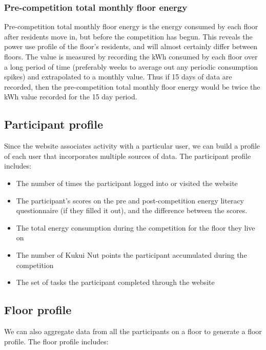 \subsubsection{Pre-competition total monthly floor energy}
Pre-competition total monthly floor energy is the energy consumed by each floor after residents move in, but before the competition has begun. This reveals the power use profile of the floor's residents, and will almost certainly differ between floors. The value is measured by recording the kWh consumed by each floor over a long period of time (preferably weeks to average out any periodic consumption spikes) and extrapolated to a monthly value. Thus if 15 days of data are recorded, then the pre-competition total monthly floor energy would be twice the kWh value recorded for the 15 day period.

\subsection{Participant profile}

Since the website associates activity with a particular user, we can build a profile of each user that incorporates multiple sources of data. The participant profile includes:

\begin{itemize}
\item The number of times the participant logged into or visited the website
\item The participant's scores on the pre and post-competition energy literacy questionnaire (if they filled it out), and the difference between the scores.
\item The total energy consumption during the competition for the floor they live on
\item The number of Kukui Nut points the participant accumulated during the competition
\item The set of tasks the participant completed through the website
\end{itemize}

\subsection{Floor profile}

We can also aggregate data from all the participants on a floor to generate a floor profile. The floor profile includes:

